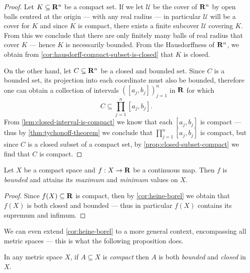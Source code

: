 \begin{proof}
Let \(K \subseteq \mathbf{R}^n\) be a compact set. If we let \(\mathcal{U}\) be the
cover of \(\mathbf{R}^n\) by open balls centred at the origin --- with any real radius
--- in particular \(\mathcal{U}\) will be a cover for \(K\) and since \(K\) is
compact, there exists a finite subcover \(\mathcal{U}\) covering \(K\). From
this we conclude that there are only finitely many balls of real radius that
cover \(K\) --- hence \(K\) is necessarily bounded. From the Hausdorffness of
\(\mathbf{R}^n\), we obtain from \cref{cor:hausdorff-compact-subset-is-closed} that
\(K\) is closed.

On the other hand, let \(C \subseteq \mathbf{R}^n\) be a closed and bounded set. Since
\(C\) is a bounded set, its projection into each coordinate must also be
bounded, therefore one can obtain a collection of intervals
\(([a_j, b_j])_{j=1}^n\) in \(\mathbf{R}\) for which
\[
C \subseteq \prod_{j=1}^n [a_j, b_j].
\]
From \cref{lem:closed-interval-is-compact} we know that each \([a_j, b_j]\) is
compact --- thus by \cref{thm:tychonoff-theorem} we conclude that
\(\prod_{j=1}^n [a_j, b_j]\) is compact, but since \(C\) is a closed subset of a
compact set, by \cref{prop:closed-subset-compact} we find that \(C\) is compact.
\end{proof}

\begin{corollary}
\label{cor:extreme-values-on-compact-sets}
Let \(X\) be a compact space and \(f: X \to \mathbf{R}\) be a continuous map. Then \(f\)
is \emph{bounded} and attains its \emph{maximum} and \emph{minimum} values on
\(X\).
\end{corollary}

\begin{proof}
Since \(f(X) \subseteq \mathbf{R}\) is compact, then by \cref{cor:heine-borel} we obtain
that \(f(X)\) is both closed and bounded --- thus in particular \(f(X)\)
contains its supremum and infimum.
\end{proof}

We can even extend \cref{cor:heine-borel} to a more general context,
encompassing all metric spaces --- this is what the following proposition does.

\begin{proposition}
\label{prop:metric-space-compact-implies-bounded-closed}
In any metric space \(X\), if \(A \subseteq X\) is \emph{compact} then \(A\) is
both \emph{bounded} and \emph{closed} in \(X\).
\end{proposition}

